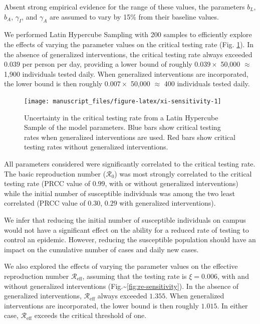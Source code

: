 \documentclass[
]{article}
\begin{document}
Absent strong empirical evidence for the range of these values, the
parameters \(b_L\), \(b_A\), \(\gamma_I\), and \(\gamma_A\) are assumed
to vary by 15\% from their baseline values.

We performed Latin Hypercube Sampling with 200 samples to efficiently
explore the effects of varying the parameter values on the critical
testing rate (Fig. \ref{fig:xi-sensitivity}). In the absence of
generalized interventions, the critical testing rate always exceeded
\(0.039\) per person per day, providing a lower bound of roughly
\(0.039\times\) 50,000 \(\approx\) 1,900 individuals tested daily. When
generalized interventions are incorporated, the lower bound is then
roughly \(0.007\times\) 50,000 \(\approx\) 400 individuals tested daily.

\begin{figure}

{\centering \texttt{[image: manuscript\_files/figure-latex/xi-sensitivity-1]} 

}

\caption{\label{fig:xi-sensitivity}Uncertainty in the critical testing rate from a Latin Hypercube Sample of the model parameters. Blue bars show critical testing rates when generalized interventions are used. Red bars show critical testing rates without generalized interventions.}\label{fig:xi-sensitivity}
\end{figure}

All parameters considered were significantly correlated to the critical
testing rate. The basic reproduction number (\(\mathcal{R}_0\)) was most
strongly correlated to the critical testing rate (PRCC value of
\(0.99\), with or without generalized interventions) while the initial
number of susceptible individuals was among the two least correlated
(PRCC value of \(0.30\), \(0.29\) with generalized interventions).

We infer that reducing the initial number of susceptible individuals on
campus would not have a significant effect on the ability for a reduced
rate of testing to control an epidemic. However, reducing the
susceptible population should have an impact on the cumulative number of
cases and daily new cases.

We also explored the effects of varying the parameter values on the
effective reproduction number \(\mathcal{R}_\text{eff}\), assuming that
the testing rate is \(\xi = 0.006\), with and without generalized
interventions (Fig.\textasciitilde{}\ref{fig:re-sensitivity}). In the
absence of generalized interventions, \(\mathcal{R}_\text{eff}\) always
exceeded \(1.355\). When generalized interventions are incorporated, the
lower bound is then roughly \(1.015\). In either case,
\(\mathcal{R}_\text{eff}\) exceeds the critical threshold of one.
\end{document}
